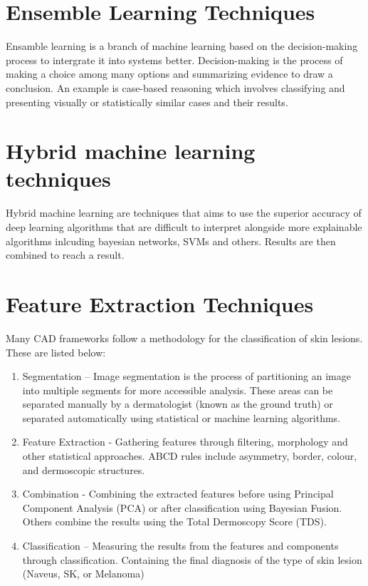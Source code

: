 \section{Ensemble Learning Techniques}
Ensamble learning is a branch of machine learning based on the decision-making process to intergrate it into systems better\cite{xu2022}. Decision-making is the process of making a choice among many options and summarizing evidence to draw a conclusion. An example is case-based reasoning which involves classifying and presenting visually or statistically similar cases and their results.


\section{Hybrid machine learning techniques}
Hybrid machine learning are techniques that aims to use the superior accuracy of deep learning algorithms that are difficult to interpret alongside more explainable algorithms inlcuding bayesian networks, SVMs and others. Results are then combined to reach a result.

\section{Feature Extraction Techniques}
Many CAD frameworks follow a methodology for the classification of skin lesions. These are listed below:

\begin{enumerate}
	
	\item Segmentation – Image segmentation is the process of partitioning an image into multiple segments for more accessible analysis. These areas can be separated manually by a dermatologist (known as the ground truth) or separated automatically using statistical or machine learning algorithms.
	
	\item Feature Extraction - Gathering features through filtering, morphology and other statistical approaches. ABCD rules include asymmetry, border, colour, and dermoscopic structures.

	\item Combination - Combining the extracted features before using Principal Component Analysis (PCA) or after classification using Bayesian Fusion. Others combine the results using the Total Dermoscopy Score (TDS).
	
	\item Classification – Measuring the results from the features and components through classification. Containing the final diagnosis of the type of skin lesion (Naveus, SK, or Melanoma)

\end{enumerate}

